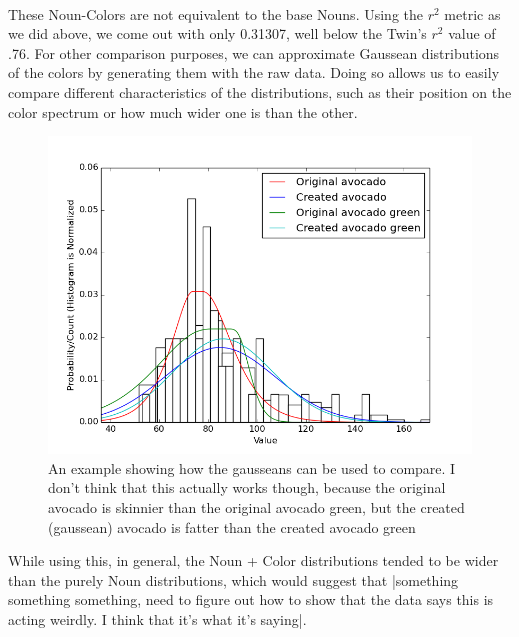 \documentclass[12pt, letterpaper]{article}
\begin{document}
\paragraph{} These Noun-Colors are not equivalent to the base Nouns. Using the $r^2$ metric as we did above, we come out with only 0.31307, well below the Twin's $r^2$ value of .76. For other comparison purposes, we can approximate Gaussean distributions of the colors by generating them with the raw data. Doing so allows us to easily compare different characteristics of the distributions, such as their position on the color spectrum or how much wider one is than the other.
\begin{figure}[h]
\begin{center}
\includegraphics[width=.75\textwidth]{gaussean_differences}
\end{center}
\label{fig:gauss_diff_avocado}
\caption{An example showing how the gausseans can be used to compare. I don't think that this actually works though, because the original avocado is skinnier than the original avocado green, but the created (gaussean) avocado is fatter than the created avocado green}
\end{figure}While using this, in general, the Noun + Color distributions tended to be wider than the purely Noun distributions, which would suggest that |something something something, need to figure out how to show that the data says this is acting weirdly. I think that it's what it's saying|.%
\end{document}
